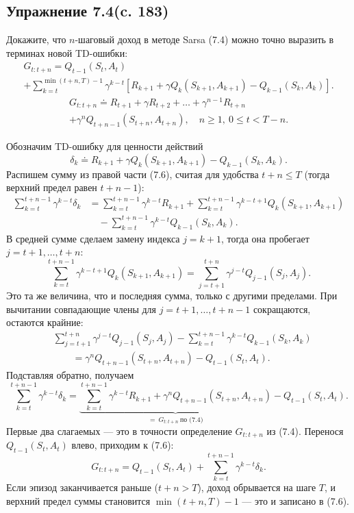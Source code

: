 \subsection{Упражнение 7.4(c. 183)}
Докажите, что $n$-шаговый доход в методе Sarsa (7.4) можно точно выразить
в терминах новой TD-ошибки:
\begin{multline}
    G_{t:t+n} = Q_{t-1}(S_t, A_t) \\
    + \sum_{k=t}^{\min(t+n,T)-1}
    \gamma^{k-t}\left[R_{k+1} + \gamma Q_k(S_{k+1}, A_{k+1}) - Q_{k-1}(S_k, A_k)\right].
    \tag{7.6}
\end{multline}
\begin{multline}
    G_{t:t+n} \doteq R_{t+1} + \gamma R_{t+2} + \dots + \gamma^{n-1} R_{t+n} \\
    + \gamma^n Q_{t+n-1}(S_{t+n}, A_{t+n}), \quad n \ge 1,\ 0 \le t < T-n.
    \tag{7.4}
\end{multline}
\begin{solution}
    Обозначим TD-ошибку для ценности действий
    \[
    \delta_k \doteq R_{k+1} + \gamma Q_k(S_{k+1}, A_{k+1}) - Q_{k-1}(S_k, A_k).
    \]
    Распишем сумму из правой части (7.6), считая для удобства $t+n \le T$
    (тогда верхний предел равен $t+n-1$):
    \begin{align*}
        \sum_{k=t}^{t+n-1} \gamma^{k-t} \delta_k
        &= \sum_{k=t}^{t+n-1} \gamma^{k-t} R_{k+1}
        + \sum_{k=t}^{t+n-1} \gamma^{k-t+1} Q_k(S_{k+1}, A_{k+1}) \\
        &\quad - \sum_{k=t}^{t+n-1} \gamma^{k-t} Q_{k-1}(S_k, A_k).
    \end{align*}
    В средней сумме сделаем замену индекса $j = k+1$, тогда она пробегает
    $j = t+1, \dots, t+n$:
    \[
    \sum_{k=t}^{t+n-1} \gamma^{k-t+1} Q_k(S_{k+1}, A_{k+1})
    = \sum_{j=t+1}^{t+n} \gamma^{j-t} Q_{j-1}(S_j, A_j).
    \]
    Это та же величина, что и последняя сумма, только с другими пределами.
    При вычитании совпадающие члены для $j = t+1, \dots, t+n-1$ сокращаются,
    остаются крайние:
    \[
    \begin{aligned}
    &\sum_{j=t+1}^{t+n} \gamma^{j-t} Q_{j-1}(S_j, A_j)
    - \sum_{k=t}^{t+n-1} \gamma^{k-t} Q_{k-1}(S_k, A_k) \\
    &\qquad = \gamma^n Q_{t+n-1}(S_{t+n}, A_{t+n}) - Q_{t-1}(S_t, A_t).
    \end{aligned}
    \]
    Подставляя обратно, получаем
    \[
    \sum_{k=t}^{t+n-1} \gamma^{k-t} \delta_k
    = \underbrace{\sum_{k=t}^{t+n-1} \gamma^{k-t} R_{k+1}
    + \gamma^n Q_{t+n-1}(S_{t+n}, A_{t+n})}_{=\ G_{t:t+n}\ \text{по (7.4)}}
    - Q_{t-1}(S_t, A_t).
    \]
    Первые два слагаемых --- это в точности определение $G_{t:t+n}$ из (7.4).
    Перенося $Q_{t-1}(S_t, A_t)$ влево, приходим к (7.6):
    \[
    G_{t:t+n} = Q_{t-1}(S_t, A_t) + \sum_{k=t}^{t+n-1} \gamma^{k-t} \delta_k.
    \]
    Если эпизод заканчивается раньше ($t+n > T$), доход обрывается на шаге $T$,
    и верхний предел суммы становится $\min(t+n,T)-1$ --- это и записано в (7.6).
\end{solution}

